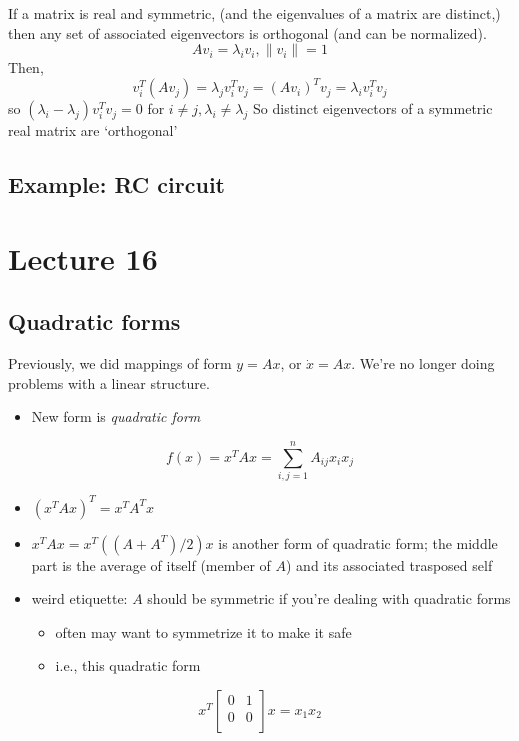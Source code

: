 \documentclass[10pt,letterpaper]{article}
\begin{document}
If a matrix is real and symmetric, (and the eigenvalues of a matrix are distinct,) then any set of associated eigenvectors is orthogonal (and can be normalized).
$$ 
A v _{i} =\lambda _{i} v _{i}, \|v_i\| = 1
$$
Then,
$$ 
v _{i} ^{T} (A v _{j} ) = \lambda _{j} v _{i} ^{T} v _{j} = (A v _{i} ) ^{T} v _{j} = \lambda _{i} v _{i} ^{T} v _{j} 
$$
so $(\lambda_i - \lambda_j) v _{i} ^{T} v _{j} =0$ for $i\ne j, \lambda _{i} \ne \lambda _{j}$ 
So distinct eigenvectors of a symmetric real matrix are `orthogonal'
\subsection{Example: RC circuit}
\label{sec-14_4}
\section{Lecture 16}
\label{sec-15}
\subsection{Quadratic forms}
\label{sec-15_1}

Previously, we did mappings of form $y=Ax$, or $\dot x=Ax$. We're no longer doing problems with a linear structure.
\begin{itemize}
\item New form is \emph{quadratic form}
\end{itemize}
$$
f(x) = x ^{T} Ax= \sum ^{n} _{i,j=1} A _{ij} x _{i} x _{j} 
$$
\begin{itemize}
\item $(x ^{T} A x) ^{T} = x ^{T} A ^{T} x$
\item $x ^{T} Ax= x ^{T} ((A +A ^{T} )/2)x$ is another form of quadratic form; the middle part is the average of itself (member of $A$) and its associated trasposed self
\item weird etiquette: $A$ should be symmetric if you're dealing with quadratic forms

\begin{itemize}
\item often may want to symmetrize it to make it safe
\item i.e., this quadratic form
\end{itemize}

\end{itemize}
$$
x ^{T}
\begin{bmatrix}
  0 & 1 \\
  0 & 0 \\
\end{bmatrix}
x= x_1 x_2
$$
\end{document}
